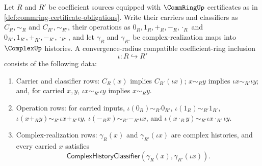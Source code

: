 \begin{definition}
\label{def:conv-rad-coefficient-ring-inclusion}
Let $R$ and $R'$ be coefficient sources equipped with $\CommRingUp$ certificates as in \autoref{def:commring-certificate-obligations}. Write their carriers and classifiers as $C_R,\sim_R$ and $C_{R'},\sim_{R'}$, their operations as $0_R,1_R,+_R,-_R,\cdot_R$ and $0_{R'},1_{R'},+_{R'},-_{R'},\cdot_{R'}$, and let $\gamma_R$ and $\gamma_{R'}$ be complex-realization maps into $\ComplexUp$ histories. A convergence-radius compatible coefficient-ring inclusion
$$
\iota:R\hookrightarrow R'
$$
consists of the following data:
\begin{enumerate}
  \item Carrier and classifier rows: $C_R(x)$ implies $C_{R'}(\iota x)$; $x\sim_R y$ implies $\iota x\sim_{R'}\iota y$; and, for carried $x,y$, $\iota x\sim_{R'}\iota y$ implies $x\sim_R y$.
  \item Operation rows: for carried inputs, $\iota(0_R)\sim_{R'}0_{R'}$, $\iota(1_R)\sim_{R'}1_{R'}$, $\iota(x+_R y)\sim_{R'}\iota x+_{R'}\iota y$, $\iota(-_R x)\sim_{R'}-_{R'}\iota x$, and $\iota(x\cdot_R y)\sim_{R'}\iota x\cdot_{R'}\iota y$.
  \item Complex-realization rows: $\gamma_R(x)$ and $\gamma_{R'}(\iota x)$ are complex histories, and every carried $x$ satisfies
$$
\mathsf{ComplexHistoryClassifier}(\gamma_R(x),\gamma_{R'}(\iota x)).
$$
\end{enumerate}
\end{definition}

